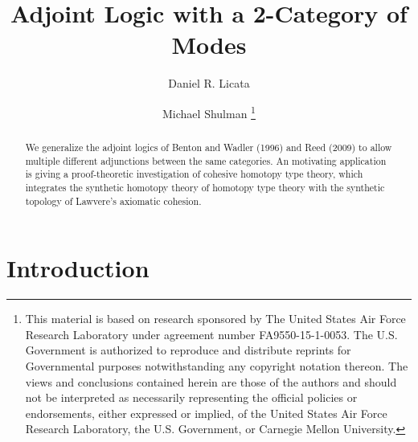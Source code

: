 \documentclass{drl-common/llncs}
\title{Adjoint Logic with a 2-Category of Modes}
\author{Daniel R. Licata\inst{1} \and Michael Shulman\inst{2}
\thanks{
This material is based on research sponsored by The United States Air
Force Research Laboratory under agreement number FA9550-15-1-0053. The
U.S. Government is authorized to reproduce and distribute reprints for
Governmental purposes notwithstanding any copyright notation thereon.
The views and conclusions contained herein are those of the authors and
should not be interpreted as necessarily representing the official
policies or endorsements, either expressed or implied, of the United
States Air Force Research Laboratory, the U.S. Government, or Carnegie
Mellon University.
}}
\institute{Wesleyan University \and University of San Diego}
\begin{document}
\maketitle

\begin{abstract}
We generalize the adjoint logics of Benton and Wadler (1996) and Reed
(2009) to allow multiple different adjunctions between the same
categories.  An motivating application is giving a proof-theoretic
investigation of cohesive homotopy type theory, which integrates the
synthetic homotopy theory of homotopy type theory with the synthetic
topology of Lawvere's axiomatic cohesion.  
\end{abstract}

\section{Introduction}
\end{document}
